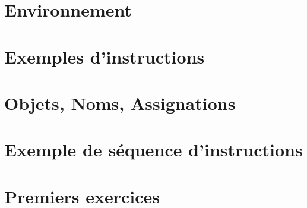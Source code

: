

\usepackage{parcolumns}
\setlength{\parindent}{0pt}

 

%

\section{Environnement}


\section{Exemples d'instructions}


\section{Objets, Noms, Assignations}


\section{Exemple de séquence d'instructions}


\section{Premiers exercices}


